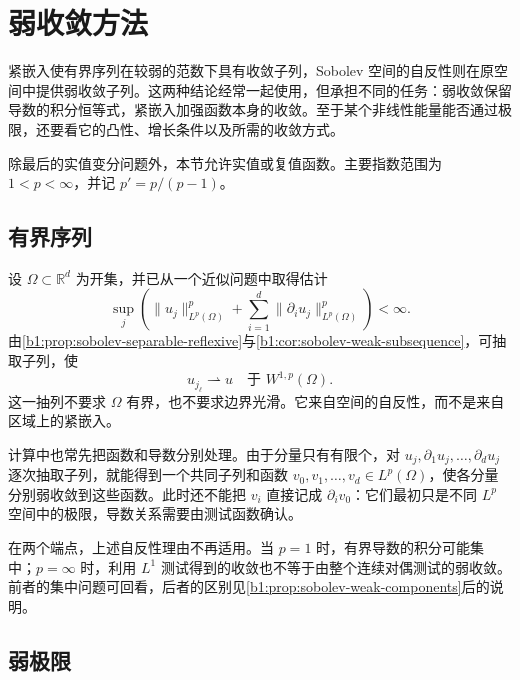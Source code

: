 \section{弱收敛方法}
\label{b1:sec:2503}

紧嵌入使有界序列在较弱的范数下具有收敛子列，Sobolev 空间的自反性则在原空间中提供弱收敛子列。这两种结论经常一起使用，但承担不同的任务：弱收敛保留导数的积分恒等式，紧嵌入加强函数本身的收敛。至于某个非线性能量能否通过极限，还要看它的凸性、增长条件以及所需的收敛方式。

\ProseParagraphBreak

除最后的实值变分问题外，本节允许实值或复值函数。主要指数范围为 \(1<p<\infty\)，并记 \(p'=p/(p-1)\)。

\subsection{有界序列}
\label{b1:subsec:250301}

设 \(\Omega\subset\mathbb R^d\) 为开集，并已从一个近似问题中取得估计
\[
 \sup_j\left(
   \|u_j\|_{L^p(\Omega)}^p+
   \sum_{i=1}^d\|\partial_i u_j\|_{L^p(\Omega)}^p
 \right)<\infty.
\]
由\cref{b1:prop:sobolev-separable-reflexive}与\cref{b1:cor:sobolev-weak-subsequence}，可抽取子列，使
\[
 u_{j_\ell}\rightharpoonup u
 \quad\text{于 }W^{1,p}(\Omega).
\]
这一抽列不要求 \(\Omega\) 有界，也不要求边界光滑。它来自空间的自反性，而不是来自区域上的紧嵌入。

\ProseParagraphBreak

计算中也常先把函数和导数分别处理。由于分量只有有限个，对
\(u_j,\partial_1u_j,\ldots,\partial_du_j\) 逐次抽取子列，就能得到一个共同子列和函数 \(v_0,v_1,\ldots,v_d\in L^p(\Omega)\)，使各分量分别弱收敛到这些函数。此时还不能把 \(v_i\) 直接记成 \(\partial_i v_0\)：它们最初只是不同 \(L^p\) 空间中的极限，导数关系需要由测试函数确认。

\ProseParagraphBreak

在两个端点，上述自反性理由不再适用。当 \(p=1\) 时，有界导数的积分可能集中；\(p=\infty\) 时，利用 \(L^1\) 测试得到的\WeakStar{}收敛也不等于由整个连续对偶测试的弱收敛。前者的集中问题可回看，后者的区别见\cref{b1:prop:sobolev-weak-components}后的说明。

\subsection{弱极限}
\label{b1:subsec:250302}

